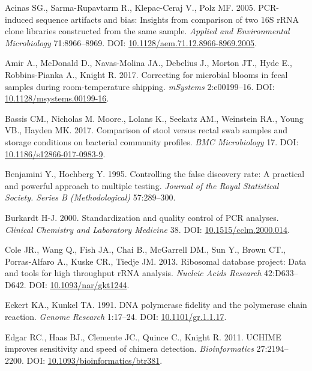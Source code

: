 \documentclass[12pt,]{article}
\begin{document}
\hypertarget{refs}{}
\hypertarget{ref-Acinas2005}{}
Acinas SG., Sarma-Rupavtarm R., Klepac-Ceraj V., Polz MF. 2005.
PCR-induced sequence artifacts and bias: Insights from comparison of two
16S rRNA clone libraries constructed from the same sample. \emph{Applied
and Environmental Microbiology} 71:8966--8969. DOI:
\href{https://doi.org/10.1128/aem.71.12.8966-8969.2005}{10.1128/aem.71.12.8966-8969.2005}.

\hypertarget{ref-Amir2017}{}
Amir A., McDonald D., Navas-Molina JA., Debelius J., Morton JT., Hyde
E., Robbins-Pianka A., Knight R. 2017. Correcting for microbial blooms
in fecal samples during room-temperature shipping. \emph{mSystems}
2:e00199--16. DOI:
\href{https://doi.org/10.1128/msystems.00199-16}{10.1128/msystems.00199-16}.

\hypertarget{ref-storage_Bassis_2017}{}
Bassis CM., Nicholas M. Moore., Lolans K., Seekatz AM., Weinstein RA.,
Young VB., Hayden MK. 2017. Comparison of stool versus rectal swab
samples and storage conditions on bacterial community profiles.
\emph{BMC Microbiology} 17. DOI:
\href{https://doi.org/10.1186/s12866-017-0983-9}{10.1186/s12866-017-0983-9}.

\hypertarget{ref-benjamini_controlling_1995}{}
Benjamini Y., Hochberg Y. 1995. Controlling the false discovery rate: A
practical and powerful approach to multiple testing. \emph{Journal of
the Royal Statistical Society. Series B (Methodological)} 57:289--300.

\hypertarget{ref-Burkardt2000}{}
Burkardt H-J. 2000. Standardization and quality control of PCR analyses.
\emph{Clinical Chemistry and Laboratory Medicine} 38. DOI:
\href{https://doi.org/10.1515/cclm.2000.014}{10.1515/cclm.2000.014}.

\hypertarget{ref-rdp_Cole_2013}{}
Cole JR., Wang Q., Fish JA., Chai B., McGarrell DM., Sun Y., Brown CT.,
Porras-Alfaro A., Kuske CR., Tiedje JM. 2013. Ribosomal database
project: Data and tools for high throughput rRNA analysis. \emph{Nucleic
Acids Research} 42:D633--D642. DOI:
\href{https://doi.org/10.1093/nar/gkt1244}{10.1093/nar/gkt1244}.

\hypertarget{ref-Eckert1991}{}
Eckert KA., Kunkel TA. 1991. DNA polymerase fidelity and the polymerase
chain reaction. \emph{Genome Research} 1:17--24. DOI:
\href{https://doi.org/10.1101/gr.1.1.17}{10.1101/gr.1.1.17}.

\hypertarget{ref-uchime_Edgar_2011}{}
Edgar RC., Haas BJ., Clemente JC., Quince C., Knight R. 2011. UCHIME
improves sensitivity and speed of chimera detection.
\emph{Bioinformatics} 27:2194--2200. DOI:
\href{https://doi.org/10.1093/bioinformatics/btr381}{10.1093/bioinformatics/btr381}.
\end{document}
